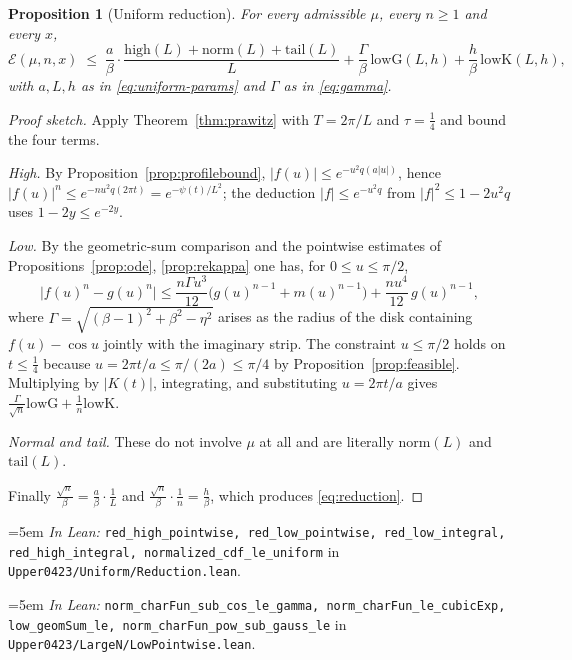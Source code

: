 \documentclass[11pt,a4paper]{article}
\newtheorem{proposition}[theorem]{Proposition}
\theoremstyle{definition}
\newcommand{\Lean}[1]{\texttt{#1}}
\newcommand{\file}[1]{\texttt{#1}}
\newcommand{\formal}[2]{%
  \par\smallskip
  \begingroup\small\raggedright\emergencystretch=5em
  \noindent\textit{In Lean:} \Lean{#1} in \file{#2}.\par
  \endgroup\smallskip}
\begin{document}
\begin{proposition}[Uniform reduction]
  \label{prop:reduction}
  For every admissible $\mu$, every $n\ge1$ and every $x$,
  \begin{equation}
    \label{eq:reduction}
    \mathcal E(\mu,n,x)\;\le\;
    \frac{a}{\beta}\cdot
      \frac{\mathrm{high}(L)+\mathrm{norm}(L)+\mathrm{tail}(L)}{L}
    +\frac{\Gamma}{\beta}\,\mathrm{lowG}(L,h)
    +\frac{h}{\beta}\,\mathrm{lowK}(L,h) ,
  \end{equation}
  with $a,L,h$ as in \eqref{eq:uniform-params} and $\Gamma$ as in
  \eqref{eq:gamma}.
\end{proposition}
\begin{proof}[Proof sketch]
  Apply Theorem~\ref{thm:prawitz} with $T=2\pi/L$ and $\tau=\tfrac14$ and bound
  the four terms.

  \emph{High.} By Proposition~\ref{prop:profilebound},
  $|f(u)|\le e^{-u^2q(a|u|)}$, hence
  $|f(u)|^n\le e^{-nu^2q(2\pi t)}=e^{-\psi(t)/L^2}$; the deduction
  $|f|\le e^{-u^2q}$ from $|f|^2\le1-2u^2q$ uses $1-2y\le e^{-2y}$.

  \emph{Low.} By the geometric-sum comparison and the pointwise estimates of
  Propositions~\ref{prop:ode}, \ref{prop:rekappa} one has, for
  $0\le u\le\pi/2$,
  \[
    \bigl|f(u)^n-g(u)^n\bigr|
    \le \frac{n\Gamma u^3}{12}\bigl(g(u)^{n-1}+m(u)^{n-1}\bigr)
      +\frac{n u^4}{12}\,g(u)^{n-1} ,
  \]
  where $\Gamma=\sqrt{(\beta-1)^2+\beta^2-\eta^2}$ arises as the radius of the
  disk containing $f(u)-\cos u$ jointly with the imaginary strip. The constraint
  $u\le\pi/2$ holds on $t\le\tfrac14$ because $u=2\pi t/a\le\pi/(2a)\le\pi/4$ by
  Proposition~\ref{prop:feasible}. Multiplying by $|K(t)|$, integrating, and
  substituting $u=2\pi t/a$ gives
  $\tfrac{\Gamma}{\sqrt n}\mathrm{lowG}+\tfrac1n\mathrm{lowK}$.

  \emph{Normal and tail.} These do not involve $\mu$ at all and are literally
  $\mathrm{norm}(L)$ and $\mathrm{tail}(L)$.

  Finally $\tfrac{\sqrt n}{\beta}=\tfrac{a}{\beta}\cdot\tfrac1L$ and
  $\tfrac{\sqrt n}{\beta}\cdot\tfrac{1}{n}=\tfrac{h}{\beta}$, which produces
  \eqref{eq:reduction}.
\end{proof}
\formal{red\_high\_pointwise, red\_low\_pointwise, red\_low\_integral, red\_high\_integral, normalized\_cdf\_le\_uniform}{Upper0423/Uniform/Reduction.lean}
\formal{norm\_charFun\_sub\_cos\_le\_gamma, norm\_charFun\_le\_cubicExp, low\_geomSum\_le, norm\_charFun\_pow\_sub\_gauss\_le}{Upper0423/LargeN/LowPointwise.lean}
\end{document}

